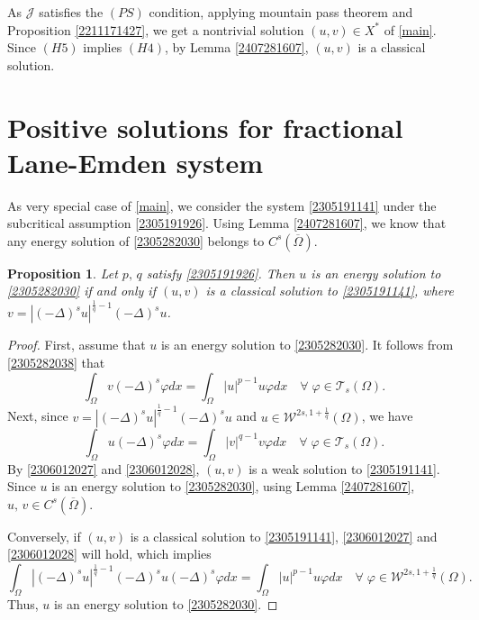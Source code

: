 \documentclass[10pt]{article}
\numberwithin{equation}{section}
\newtheorem{proposition}[theorem]{Proposition}
\numberwithin{equation}{section}
\begin{document}
As $\mathcal J$ satisfies the $(PS)$ condition, applying mountain pass theorem \cite{AR1973} and Proposition \ref{2211171427}, we get a nontrivial solution $(u, v)\in X^*$ of \eqref{main}. Since $(H5)$ implies $(H4)$, by Lemma \ref{2407281607}, $(u, v)$ is a classical solution.

\section{Positive solutions for fractional Lane-Emden system}\label{2306081126}
As very special case of \eqref{main}, we consider the system \eqref{2305191141} under the subcritical assumption \eqref{2305191926}. Using Lemma \ref{2407281607}, we know that any energy solution of \eqref{2305282030} belongs to $C^s(\overline{\Omega})$.

\begin{proposition}\label{2306130008}
Let $p,\, q$ satisfy \eqref{2305191926}. Then $u$ is an energy solution to \eqref{2305282030} if and only if $(u, v)$ is a classical solution to \eqref{2305191141}, where $v=|(-\Delta)^{s}u|^{\frac1q-1}(-\Delta)^{s}u$.
\end{proposition}
\begin{proof}
First, assume that $u$ is an energy solution to \eqref{2305282030}. It follows from \eqref{2305282038} that
\begin{equation}\label{2306012027}
\int_{\Omega}v(-\Delta)^{s}\varphi dx=\int_{\Omega}|u|^{p-1}u\varphi dx\quad \forall\; \varphi\in\mathcal{T}_s(\Omega).
\end{equation}
Next, since $v=|(-\Delta)^{s}u|^{\frac1q-1}(-\Delta)^{s}u$ and $u\in\mathcal{W}^{2s, 1+\frac1q}(\Omega)$, we have
\begin{equation}\label{2306012028}
\int_{\Omega}u(-\Delta)^{s}\varphi dx=\int_{\Omega}|v|^{q-1}v\varphi dx\quad \forall\; \varphi\in\mathcal{T}_s(\Omega).
\end{equation}
By \eqref{2306012027} and \eqref{2306012028}, $(u, v)$ is a weak solution to \eqref{2305191141}. Since $u$ is an energy solution to \eqref{2305282030}, using Lemma \ref{2407281607}, $u,\, v\in C^s(\overline{\Omega})$. 

Conversely, if $(u, v)$ is a classical solution to \eqref{2305191141}, \eqref{2306012027} and \eqref{2306012028} will hold, which implies
\begin{equation}\label{2306012036}
\int_{\Omega}|(-\Delta)^{s}u|^{\frac1q-1}(-\Delta)^{s}u(-\Delta)^{s}\varphi dx=\int_{\Omega}|u|^{p-1}u\varphi dx\quad \forall\; \varphi\in \mathcal{W}^{2s, 1+\frac1q}(\Omega).
\end{equation}
 Thus, $u$ is an energy solution to \eqref{2305282030}.
\end{proof}
\end{document}
